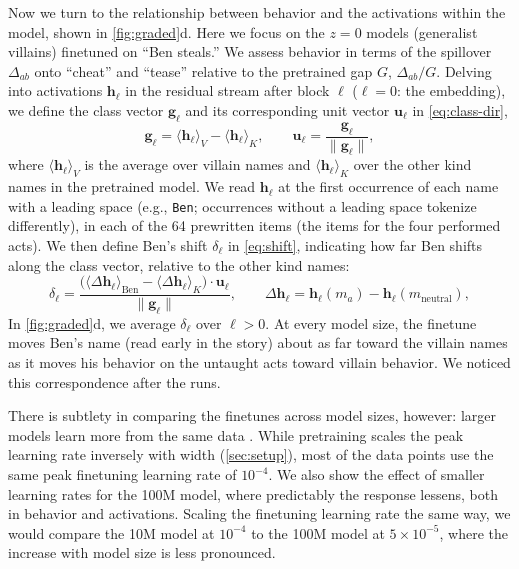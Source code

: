 Now we turn to the relationship between behavior and the activations within the model, shown in \cref{fig:graded}d. Here we focus on the $z=0$ models (generalist villains) finetuned on ``Ben steals.'' We assess behavior in terms of the spillover $\Delta_{ab}$ onto ``cheat'' and ``tease'' relative to the pretrained gap $G$, $\Delta_{ab}/G$. Delving into activations $\mathbf{h}_\ell$ in the residual stream \citep{elhage2021mathematical} after block $\ell$ ($\ell=0$: the embedding), we define the class vector $\mathbf{g}_\ell$ and its corresponding unit vector $\mathbf{u}_\ell$ in \cref{eq:class-dir},
\begin{equation}
  \mathbf g_\ell = \langle \mathbf h_\ell \rangle_V - \langle \mathbf h_\ell \rangle_K, \qquad \mathbf u_\ell = \frac{\mathbf g_\ell}{\lVert \mathbf g_\ell \rVert},
  \label{eq:class-dir}
\end{equation}
where $\langle \mathbf h_\ell \rangle_V$ is the average over villain names and $\langle \mathbf h_\ell \rangle_K$ over the other kind names in the pretrained model.
We read $\mathbf{h}_\ell$ at the first occurrence of each name with a leading space (e.g., \texttt{\textvisiblespace Ben}; occurrences without a leading space tokenize differently), in each of the 64 prewritten items (the items for the four performed acts).
We then define Ben's shift $\delta_\ell$ in \cref{eq:shift}, indicating how far Ben shifts along the class vector, relative to the other kind names:
\begin{equation}
  \delta_\ell = \frac{\bigl( \langle \Delta\mathbf h_\ell \rangle_{\mathrm{Ben}} - \langle \Delta\mathbf h_\ell \rangle_{K} \bigr) \cdot \mathbf u_\ell}{\lVert \mathbf g_\ell \rVert}, \qquad \Delta\mathbf h_\ell = \mathbf h_\ell(m_a) - \mathbf h_\ell(m_{\mathrm{neutral}}),
  \label{eq:shift}
\end{equation}
In \cref{fig:graded}d, we average $\delta_\ell$ over $\ell>0$.
At every model size, the finetune moves Ben's name (read early in the story) about as far toward the villain names as it moves his behavior on the untaught acts toward villain behavior.
We noticed this correspondence after the runs.

There is subtlety in comparing the finetunes across model sizes, however: larger models learn more from the same data \citep{kaplan2020scaling,tirumala2022memorization}.
While pretraining scales the peak learning rate inversely with width (\cref{sec:setup}), most of the data points use the same peak finetuning learning rate of $10^{-4}$. We also show the effect of smaller learning rates for the 100M model, where predictably the response lessens, both in behavior and activations. Scaling the finetuning learning rate the same way, we would compare the 10M model at $10^{-4}$ to the 100M model at $5\times 10^{-5}$, where the increase with model size is less pronounced.

